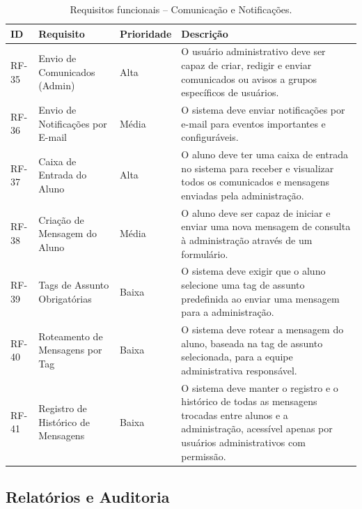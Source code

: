 \begin{table}[H]
\centering
\caption{Requisitos funcionais -- Comunicação e Notificações.}
\begin{tabularx}{\textwidth}{p{} p{} p{} X}
\toprule
\textbf{ID} & \textbf{Requisito} & \textbf{Prioridade} & \textbf{Descrição} \\
\midrule
RF-35 & Envio de Comunicados (Admin) & Alta & O usuário administrativo deve ser capaz de criar, redigir e enviar comunicados ou avisos a grupos específicos de usuários. \\
RF-36 & Envio de Notificações por E-mail & Média & O sistema deve enviar notificações por e-mail para eventos importantes e configuráveis. \\
RF-37 & Caixa de Entrada do Aluno & Alta & O aluno deve ter uma caixa de entrada no sistema para receber e visualizar todos os comunicados e mensagens enviadas pela administração. \\
RF-38 & Criação de Mensagem do Aluno & Média & O aluno deve ser capaz de iniciar e enviar uma nova mensagem de consulta à administração através de um formulário. \\
RF-39 & Tags de Assunto Obrigatórias & Baixa & O sistema deve exigir que o aluno selecione uma tag de assunto predefinida ao enviar uma mensagem para a administração. \\
RF-40 & Roteamento de Mensagens por Tag & Baixa & O sistema deve rotear a mensagem do aluno, baseada na tag de assunto selecionada, para a equipe administrativa responsável. \\
RF-41 & Registro de Histórico de Mensagens & Baixa & O sistema deve manter o registro e o histórico de todas as mensagens trocadas entre alunos e a administração, acessível apenas por usuários administrativos com permissão. \\
\bottomrule
\end{tabularx}
\end{table}

\subsection{Relatórios e Auditoria}

